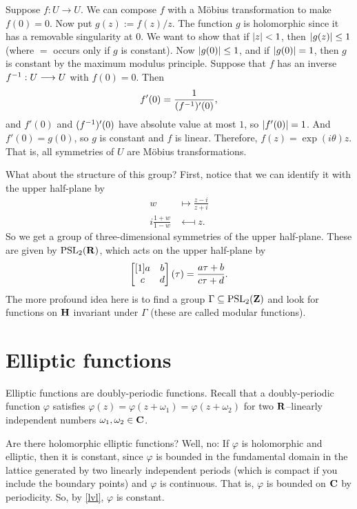 \documentclass[11pt, oneside,margin=1in]{article}
\begin{document}
Suppose $f:U\longrightarrow U$. We can compose $f$ with a M\"obius transformation to make $f(0)=0$. Now put $g(z):=f (z)/z$. The function $g$ is holomorphic since it has a removable singularity at $0$. We want to show that if $\left \lvert z \right \rvert<1$, then $\left \lvert g(z) \right \rvert\le 1$ (where $=$ occurs only if $g$ is constant). Now $\left \lvert g(0) \right \rvert \le 1$, and if $\left \lvert g(0) \right \rvert = 1$, then $g$ is constant by the maximum modulus principle. Suppose that $f$ has an inverse $f^{-1} : U\longrightarrow U$ with $f(0)=0$. Then 
\begin{align*}
	f'(0) = \frac{1}{ (f^{-1})'  (0)},
\end{align*}
and $f'(0)$ and $(f^{-1})' (0)$ have absolute value at most $1$, so $\left \lvert f'(0) \right \rvert = 1$. And $f'(0)=g (0)$, so $g$ is constant and $f$ is linear. Therefore, $f(z)=\exp (i\theta)z$. That is, all symmetries of $U$ are M\"obius transformations.

What about the structure of this group? First, notice that we can identify it with the upper half-plane by
\begin{align*}
	w &\longmapsto \frac{z-i}{z+i}\\
	i\frac{1+w}{1-w} &\longmapsfrom z.
\end{align*}
So we get a group of three-dimensional symmetries of the upper half-plane. These are given by $\operatorname{PSL}_2(\mathbf R)$, which acts on the upper half-plane by 
\begin{align*}
	\begin{bmatrix} [1] a&b\\c&d\end{bmatrix}(\tau) = \frac{a\tau + b}{c\tau +d}.
\end{align*}
The more profound idea here is to find a group $\Gamma\subseteq \operatorname{PSL}_2(\mathbf Z)$ and look for functions on $\mathbf H$ invariant under $\Gamma$ (these are called modular functions). 

\section{Elliptic functions}
Elliptic functions are doubly-periodic functions. Recall that a doubly-periodic function $\varphi$ satisfies $\varphi(z) = \varphi (z+\omega_1) = \varphi  (z+\omega_2)$ for two $\mathbf R$--linearly independent numbers $\omega_1,\omega_2\in \mathbf C$. 

Are there holomorphic elliptic functions? Well, no: If $\varphi$ is holomorphic and elliptic, then it is constant, since $\varphi$ is bounded in the fundamental domain in the lattice generated by two linearly independent periods (which is compact if you include the boundary points) and $\varphi$ is continuous. That is, $\varphi$ is bounded on $\mathbf C$ by periodicity. So, by \cref{lvl}, $\varphi$ is constant.
\end{document}

